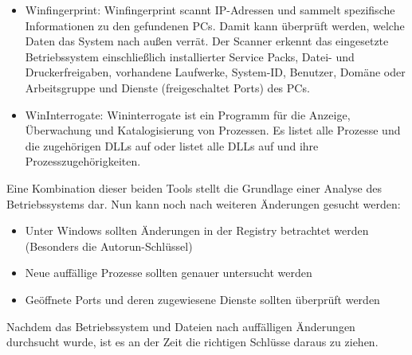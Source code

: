 \begin{itemize}
\item Winfingerprint: Winfingerprint scannt IP-Adressen und sammelt spezifische Informationen zu den gefundenen PCs. Damit kann überprüft werden, welche Daten das System nach außen verrät. Der Scanner erkennt das eingesetzte Betriebssystem einschließlich installierter Service Packs, Datei- und Druckerfreigaben, vorhandene Laufwerke, System-ID, Benutzer, Domäne oder Arbeitsgruppe und Dienste (freigeschaltet Ports) des PCs.
\item WinInterrogate: Wininterrogate ist ein Programm für die Anzeige, Überwachung und Katalogisierung von Prozessen. Es listet alle Prozesse und die zugehörigen DLLs auf oder listet alle DLLs auf und ihre Prozesszugehörigkeiten.
\end{itemize}

\noindent Eine Kombination dieser beiden Tools stellt die Grundlage einer Analyse des Betriebssystems dar. Nun kann noch nach weiteren Änderungen gesucht werden:

\begin{itemize}
\item Unter Windows sollten Änderungen in der Registry betrachtet werden (Besonders die Autorun-Schlüssel)
\item Neue auffällige Prozesse sollten genauer untersucht werden
\item Geöffnete Ports und deren zugewiesene Dienste sollten überprüft werden
\end{itemize} 

\noindent Nachdem das Betriebssystem und Dateien nach auffälligen Änderungen durchsucht wurde, ist es an der Zeit die richtigen Schlüsse daraus zu ziehen.